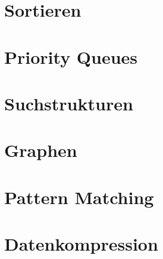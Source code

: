 \documentclass[12pt,a4paper]{article}
\begin{document}
\section{Sortieren}
\section{Priority Queues}
\section{Suchstrukturen}
\section{Graphen}
\section{Pattern Matching}
\section{Datenkompression}
\end{document}
